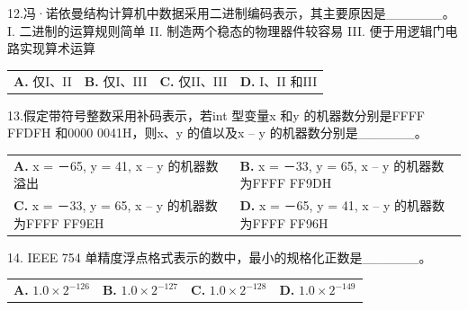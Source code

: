 \documentclass[UTF8,11pt]{ctexart}
\begin{document}
12.冯·诺依曼结构计算机中数据采用二进制编码表示，其主要原因是\_\_\_\_\_\_。 I. 二进制的运算规则简单 II. 制造两个稳态的物理器件较容易 III. 便于用逻辑门电路实现算术运算


\begin{center}\begin{tabular}{>{\raggedright\arraybackslash}p{\dimexpr(\linewidth-8\tabcolsep)/4\relax}>{\raggedright\arraybackslash}p{\dimexpr(\linewidth-8\tabcolsep)/4\relax}>{\raggedright\arraybackslash}p{\dimexpr(\linewidth-8\tabcolsep)/4\relax}>{\raggedright\arraybackslash}p{\dimexpr(\linewidth-8\tabcolsep)/4\relax}}
\textbf{A.} 仅I、II & \textbf{B.} 仅I、III & \textbf{C.} 仅II、III & \textbf{D.} I、II 和III\\[.35em]\end{tabular}\end{center}

13.假定带符号整数采用补码表示，若int 型变量x 和y 的机器数分别是FFFF FFDFH 和0000 0041H，则x、y 的值以及x – y 的机器数分别是\_\_\_\_\_\_。


\begin{center}\begin{tabular}{>{\raggedright\arraybackslash}p{\dimexpr(\linewidth-4\tabcolsep)/2\relax}>{\raggedright\arraybackslash}p{\dimexpr(\linewidth-4\tabcolsep)/2\relax}}
\textbf{A.} x = －65, y = 41, x – y 的机器数溢出 & \textbf{B.} x = －33, y = 65, x – y 的机器数为FFFF FF9DH\\[.35em]
\textbf{C.} x = －33, y = 65, x – y 的机器数为FFFF FF9EH & \textbf{D.} x = －65, y = 41, x – y 的机器数为FFFF FF96H\\[.35em]\end{tabular}\end{center}

14. IEEE 754 单精度浮点格式表示的数中，最小的规格化正数是\_\_\_\_\_\_。


\begin{center}\begin{tabular}{>{\raggedright\arraybackslash}p{\dimexpr(\linewidth-8\tabcolsep)/4\relax}>{\raggedright\arraybackslash}p{\dimexpr(\linewidth-8\tabcolsep)/4\relax}>{\raggedright\arraybackslash}p{\dimexpr(\linewidth-8\tabcolsep)/4\relax}>{\raggedright\arraybackslash}p{\dimexpr(\linewidth-8\tabcolsep)/4\relax}}
\textbf{A.} \(\displaystyle 1.0\times2^{-126}\) & \textbf{B.} \(\displaystyle 1.0\times2^{-127}\) & \textbf{C.} \(\displaystyle 1.0\times2^{-128}\) & \textbf{D.} \(\displaystyle 1.0\times2^{-149}\)\\[.35em]\end{tabular}\end{center}
\end{document}

